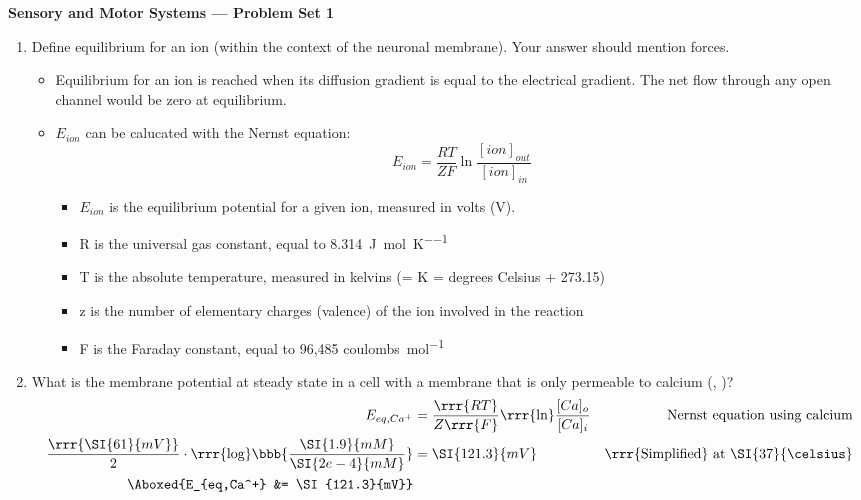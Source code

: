\documentclass[plain,worksheet]{inVerba-notes}
\begin{document}
\begin{center}
    \Large \textbf{Sensory and Motor Systems --- Problem Set 1}
\end{center}
\medskip
\begin{enumerate}
    \item Define equilibrium for an ion (within the context of the neuronal membrane). Your answer should mention forces.
    \begin{itemize}
        \item Equilibrium for an ion is reached when its diffusion gradient is equal to the electrical gradient. The net flow through any open channel would be zero at equilibrium.
        \item \(E_{ion}\) can be calucated with the Nernst equation:
        \begin{equation*}
            E_{ion}=\frac{RT}{ZF}\ln{\frac{[ion]_{out}}{[ion]_{in}}}
        \end{equation*}
        \begin{itemize}
            \item \(E_{ion}\) is the equilibrium potential for a given ion, measured in volts (V). 
            \item R is the universal gas constant, equal to \SI{8.314}{\joule\per\mole\per\kelvin}
            \item T is the absolute temperature, measured in kelvins (= K = degrees Celsius + 273.15)
            \item z is the number of elementary charges (valence) of the ion involved in the reaction
            \item F is the Faraday constant, equal to 96,485 \si{coulombs\per\mol}
        \end{itemize}
    \end{itemize}

    \item What is the membrane potential at steady state in a cell with a membrane that is only permeable to calcium (, )? 
    \begin{align*}
        E_{eq,Ca^+} &= \frac{\rrr{RT}}{Z\rrr{F}}\text{\rrr{ln}}{\frac{[Ca]_{o}}{[Ca]_{i}}} & \text{Nernst equation using calcium} \\
        \frac{\rrr{\SI{61}{mV}}}{2}\cdot \rrr{\text{log}}\bbb{\frac{\SI{1.9}{mM}}{\SI{2e-4}{mM}}}&=\SI{121.3}{mV} & \text{\rrr{Simplified} at \SI{37}{\celsius}}\\
        \Aboxed{E_{eq,Ca^+} &= \SI{121.3}{mV}}
    \end{align*}


\end{enumerate}
\end{document}

